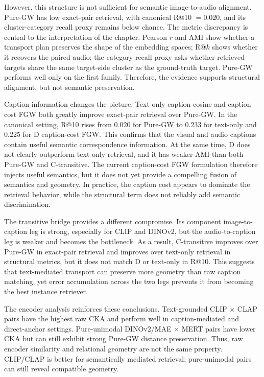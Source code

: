 However, this structure is not sufficient for semantic image-to-audio alignment. Pure-GW has low exact-pair retrieval, with canonical R@10 $=0.020$, and its cluster-category recall proxy remains below chance. The metric discrepancy is central to the interpretation of the chapter. Pearson $r$ and AMI show whether a transport plan preserves the shape of the embedding spaces; R@$k$ shows whether it recovers the paired audio; the category-recall proxy asks whether retrieved targets share the same target-side cluster as the ground-truth target. Pure-GW performs well only on the first family. Therefore, the evidence supports structural alignment, but not semantic preservation.

Caption information changes the picture. Text-only caption cosine and caption-cost FGW both greatly improve exact-pair retrieval over Pure-GW. In the canonical setting, R@10 rises from $0.020$ for Pure-GW to $0.233$ for text-only and $0.225$ for D caption-cost FGW. This confirms that the visual and audio captions contain useful semantic correspondence information. At the same time, D does not clearly outperform text-only retrieval, and it has weaker AMI than both Pure-GW and C-transitive. The current caption-cost FGW formulation therefore injects useful semantics, but it does not yet provide a compelling fusion of semantics and geometry. In practice, the caption cost appears to dominate the retrieval behavior, while the structural term does not reliably add semantic discrimination.

The transitive bridge provides a different compromise. Its component image-to-caption leg is strong, especially for CLIP and DINOv2, but the audio-to-caption leg is weaker and becomes the bottleneck. As a result, C-transitive improves over Pure-GW in exact-pair retrieval and improves over text-only retrieval in structural metrics, but it does not match D or text-only in R@10. This suggests that text-mediated transport can preserve more geometry than raw caption matching, yet error accumulation across the two legs prevents it from becoming the best instance retriever.

The encoder analysis reinforces these conclusions. Text-grounded CLIP $\times$ CLAP pairs have the highest raw CKA and perform well in caption-mediated and direct-anchor settings. Pure-unimodal DINOv2/MAE $\times$ MERT pairs have lower CKA but can still exhibit strong Pure-GW distance preservation. Thus, raw encoder similarity and relational geometry are not the same property. CLIP/CLAP is better for semantically mediated retrieval; pure-unimodal pairs can still reveal compatible geometry.

